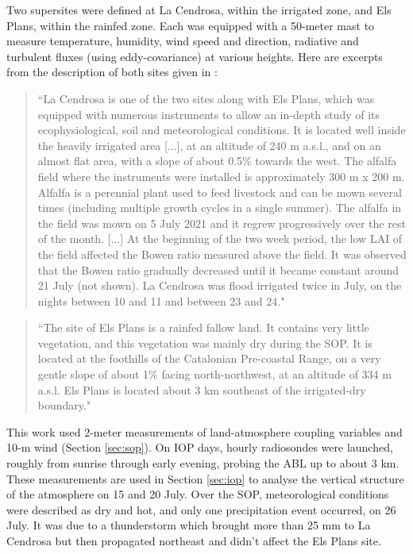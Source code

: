 Two supersites were defined at La Cendrosa, within the irrigated zone, and Els Plans, within the rainfed zone. Each was equipped with a 50-meter mast to measure temperature, humidity, wind speed and direction, radiative and turbulent fluxes (using eddy-covariance) at various heights.
Here are excerpts from the description of both sites given in \citet{lunel_interactions_2024}:
\begin{quote}
    ``La Cendrosa is one of the two sites along with Els Plans, which was equipped with numerous instruments to allow an in-depth study of its ecophysiological, soil and meteorological conditions. It is located well inside the heavily irrigated area [...], at an altitude of 240 m a.s.l., and on an almost flat area, with a slope of about 0.5\% towards the west.
    The alfalfa field where the instruments were installed is approximately 300 m x 200 m. Alfalfa is a perennial plant used to feed livestock and can be mown several times (including multiple growth cycles in a single summer). The alfalfa in the field was mown on 5 July 2021 and it regrew progressively over the rest of the month. [...] At the beginning of the two week period, the low LAI of the field affected the Bowen ratio measured above the field. It was observed that the Bowen ratio gradually decreased until it became constant around 21 July (not shown). La Cendrosa was flood irrigated twice in July, on the nights between 10 and 11 and between 23 and 24."
\end{quote}
\begin{quote}
    ``The site of Els Plans is a rainfed fallow land. It contains very little vegetation, and this vegetation was mainly dry during the SOP. It is located at the foothills of the Catalonian Pre-coastal Range, on a very gentle slope of about 1\% facing north-northwest, at an altitude of 334 m a.s.l. Els Plans is located about 3 km southeast of the irrigated-dry boundary."
\end{quote}

This work used 2-meter measurements of land-atmosphere coupling variables and 10-m wind (Section \ref{sec:sop}).
On IOP days, hourly radiosondes were launched, roughly from  sunrise through early evening, probing the ABL up to about 3 km. These measurements are used in Section \ref{sec:iop} to analyse the vertical structure of the atmosphere on 15 and 20 July.
Over the SOP, meteorological conditions were described as dry and hot, and only one precipitation event occurred, on 26 July. It was due to a thunderstorm which brought more than 25 mm to La Cendrosa but then propagated northeast and didn't affect the Els Plans site.


